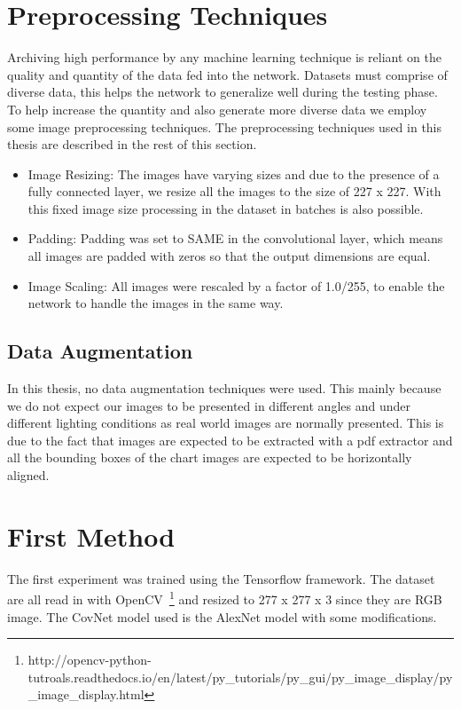 \documentclass[12pt, a4paper,oneside]{report}
\begin{document}
\section{Preprocessing Techniques}
Archiving high performance by any machine learning technique is reliant on the quality and quantity of the data fed into the network. Datasets must comprise of diverse data, this helps the network to generalize well during the testing phase. To help increase the quantity and also generate more diverse data we employ some image preprocessing techniques. The preprocessing techniques used in this thesis are described in the rest of this section.

\begin{itemize}
	\item  Image Resizing: The images have varying sizes and due to the presence of a fully connected layer, we resize all the images to the size of 227 x 227. With this fixed image size processing in the dataset in batches is also possible.
	
	\item  Padding: Padding was set to SAME in the convolutional layer, which means all images are padded with zeros so that the output dimensions are equal.
	
	\item  Image Scaling: All images were rescaled by a factor of 1.0/255, to enable the network to handle the images in the same way.
\end{itemize}

\subsection{Data Augmentation}
In this thesis, no data augmentation techniques were used. This mainly because we do not expect our images to be presented in different angles and under different lighting conditions as real world images are normally presented. This is due to the fact that images are expected to be extracted with a pdf extractor and all the bounding boxes of the chart images are expected to be horizontally aligned.  

\section{First Method}
The first experiment was trained using the Tensorflow framework.
The dataset are all read in with OpenCV~\footnote{http://opencv-python-tutroals.readthedocs.io/en/latest/py\_tutorials/py\_gui/py\_image\_display/py\_image\_display.html} and resized to 277 x 277 x 3  since they are RGB image.
The CovNet model used is the AlexNet model with some modifications. 
\end{document}
